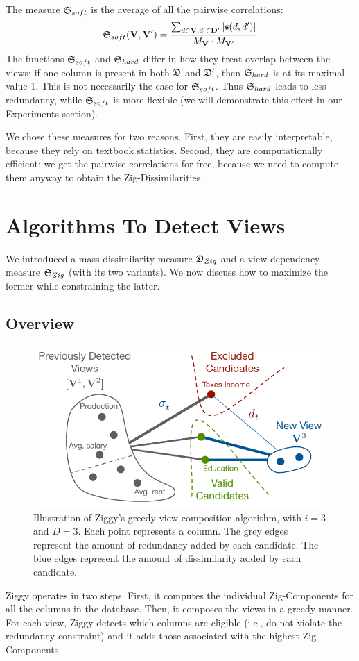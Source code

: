 The measure  $\mathfrak{S}_{soft}$ is the average of all the pairwise
correlations:
\begin{gather}
    \mf{S}_{soft}(\rb{V}, \rb{V}') = 
    \frac{\sum_{d \in \rb{V}, d' \in \rb{D}'} |\mf{s}(d, d')|}
        {M_\rb{V} \cdot M_{\rb{V}'}}
\end{gather}
The functions $\mathfrak{S}_{soft}$ and $\mathfrak{S}_{hard}$ differ in how they treat
overlap between the views: if one column is present in both $\mathfrak{D}$ and
$\mathfrak{D}'$, then $\mathfrak{S}_{hard}$ is at its maximal value 1. This is not
necessarily the case for $\mathfrak{S}_{soft}$. Thus $\mathfrak{S}_{hard}$ leads to less
redundancy, while $\mathfrak{S}_{soft}$ is more flexible (we will demonstrate this
effect in our Experiments section).

We chose these measures for two reasons. First, they are easily interpretable,
because they rely on textbook statistics.  Second, they are computationally
efficient: we get the pairwise correlations for free, because we need to
compute them anyway to obtain the Zig-Dissimilarities. 


\section{Algorithms To Detect Views}
\label{sec:algorithm}

We introduced a mass dissimilarity measure $\mathfrak{D}_{Zig}$ and a view dependency
measure $\mathfrak{S}_{Zig}$ (with its two variants). We now discuss how to maximize
the former while constraining the latter.

\subsection{Overview}
\label{sec:overview}

\begin{figure}
  \centering
  \includegraphics[width=0.8\columnwidth]{Figures/Greedy}
  \caption{Illustration of Ziggy's greedy view composition algorithm, with
  $i=3$ and $D=3$. Each point represents a column. The grey edges represent the
  amount of redundancy added by each candidate. The blue edges represent the
  amount of dissimilarity added by each candidate.}
  \label{pic:greedy}
\end{figure}
Ziggy operates in two steps. First, it computes the individual Zig-Components
for all the columns in the database. Then, it composes the views in a  greedy
manner. For each view, Ziggy detects which columns are eligible (i.e., do not
violate the redundancy constraint) and it adds those associated with the highest
Zig-Components.

